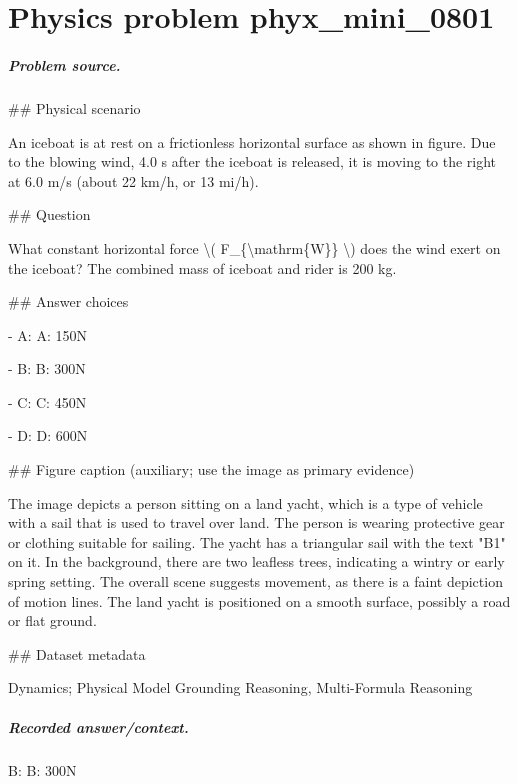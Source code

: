
\chapter{Physics problem phyx\_mini\_0801}
\label{ch:PhyXMiniProblems_problem_phyx_mini_0801}

\paragraph{Problem source.}
\#\# Physical scenario

An iceboat is at rest on a frictionless horizontal surface as shown in figure. Due to the blowing wind, 4.0 s after the iceboat is released, it is moving to the right at 6.0 m/s (about 22 km/h, or 13 mi/h).

\#\# Question

What constant horizontal force \textbackslash{}( F\_\{\textbackslash{}mathrm\{W\}\} \textbackslash{}) does the wind exert on the iceboat? The combined mass of iceboat and rider is 200 kg.

\#\# Answer choices

- A: A: 150N

- B: B: 300N

- C: C: 450N

- D: D: 600N

\#\# Figure caption (auxiliary; use the image as primary evidence)

The image depicts a person sitting on a land yacht, which is a type of vehicle with a sail that is used to travel over land. The person is wearing protective gear or clothing suitable for sailing. The yacht has a triangular sail with the text "B1" on it. In the background, there are two leafless trees, indicating a wintry or early spring setting. The overall scene suggests movement, as there is a faint depiction of motion lines. The land yacht is positioned on a smooth surface, possibly a road or flat ground.

\#\# Dataset metadata

Dynamics; Physical Model Grounding Reasoning, Multi-Formula Reasoning

\paragraph{Recorded answer/context.}
B: B: 300N


